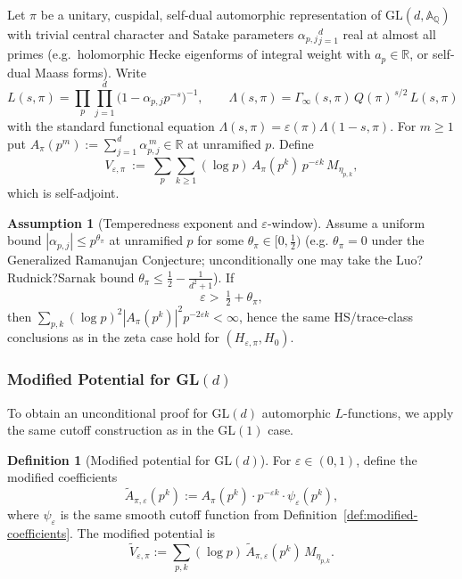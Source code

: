 ﻿\documentclass[12pt,a4paper]{article}
\theoremstyle{definition}
\newtheorem{definition}[theorem]{Definition}
\newtheorem{assumption}[theorem]{Assumption}
\theoremstyle{remark}
\begin{document}
Let $\pi$ be a unitary, cuspidal, self-dual automorphic representation of $\mathrm{GL}(d,\mathbb{A}_\mathbb Q)$ with trivial central character and Satake parameters {$\alpha_{p,j}$}$_{j=1}^{d}$ real at almost all primes (e.g.\
holomorphic Hecke eigenforms of integral weight with $a_p\in\mathbb R$, or self-dual Maass forms). 
Write
\begin{equation*}
L(s,\pi)=\prod_{p}\prod_{j=1}^{d}\big(1-\alpha_{p,j}p^{-s}\big)^{-1},
\qquad
\Lambda(s,\pi)=\Gamma_\infty(s,\pi)\,Q(\pi)^{\,s/2}\,L(s,\pi)
\end{equation*}
with the standard functional equation $\Lambda(s,\pi)=\varepsilon(\pi)\Lambda(1-s,\pi)$.
For $m\ge1$ put $A_\pi(p^m):=\sum_{j=1}^{d}\alpha_{p,j}^{\,m}\in\mathbb R$ at unramified $p$. 
Define
\begin{equation*}
V_{\varepsilon,\pi}\ :=\ \sum_{p}\sum_{k\ge1} (\log p)\,A_\pi(p^k)\,p^{-\varepsilon k}\,M_{\eta_{p,k}},
\end{equation*}
which is self-adjoint. 

\begin{assumption}[Temperedness exponent and $\varepsilon$-window]
\label{ass:theta}
Assume a uniform bound $|\alpha_{p,j}|\le p^{\theta_\pi}$ at unramified $p$ for some $\theta_\pi\in[0,\tfrac12)$
(e.g.
$\theta_\pi=0$ under the Generalized Ramanujan Conjecture; unconditionally one may take the Luo?Rudnick?Sarnak bound $\theta_\pi\le \tfrac12-\frac{1}{d^2+1}$). 
If 
\begin{equation*}
\varepsilon
>\ \tfrac12+\theta_\pi,
\end{equation*}
then $\sum_{p,k}(\log p)^2|A_\pi(p^k)|^2p^{-2\varepsilon k}<\infty$, hence the same HS/trace-class conclusions as in the zeta case hold for $(H_{\varepsilon,\pi},H_0)$.
\end{assumption}

\subsubsection{Modified Potential for GL$(d)$}

To obtain an unconditional proof for GL$(d)$ automorphic $L$-functions, we apply the same cutoff construction as in the GL$(1)$ case.

\begin{definition}[Modified potential for GL$(d)$]\label{def:modified-GLd}
For $\varepsilon \in (0,1)$, define the modified coefficients
\[
  \widetilde{A}_{\pi,\varepsilon}(p^k) := A_\pi(p^k) \cdot p^{-\varepsilon k} \cdot \psi_\varepsilon(p^k),
\]
where $\psi_\varepsilon$ is the same smooth cutoff function from Definition~\ref{def:modified-coefficients}. The modified potential is
\[
  \widetilde{V}_{\varepsilon,\pi} := \sum_{p,k} (\log p) \, \widetilde{A}_{\pi,\varepsilon}(p^k) \, M_{\eta_{p,k}}.
\]
\end{definition}
\end{document}
